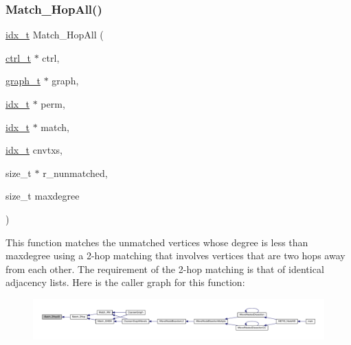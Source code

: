 \subsubsection{\texorpdfstring{Match\+\_\+Hop\+All()}{Match\_2HopAll()}}
{\footnotesize\ttfamily \hyperlink{a00876_aaa5262be3e700770163401acb0150f52}{idx\+\_\+t} Match\+\_\+Hop\+All (\begin{DoxyParamCaption}\item[{\hyperlink{a00742}{ctrl\+\_\+t} $\ast$}]{ctrl,  }\item[{\hyperlink{a00734}{graph\+\_\+t} $\ast$}]{graph,  }\item[{\hyperlink{a00876_aaa5262be3e700770163401acb0150f52}{idx\+\_\+t} $\ast$}]{perm,  }\item[{\hyperlink{a00876_aaa5262be3e700770163401acb0150f52}{idx\+\_\+t} $\ast$}]{match,  }\item[{\hyperlink{a00876_aaa5262be3e700770163401acb0150f52}{idx\+\_\+t}}]{cnvtxs,  }\item[{size\+\_\+t $\ast$}]{r\+\_\+nunmatched,  }\item[{size\+\_\+t}]{maxdegree }\end{DoxyParamCaption})}

This function matches the unmatched vertices whose degree is less than maxdegree using a 2-\/hop matching that involves vertices that are two hops away from each other. The requirement of the 2-\/hop matching is that of identical adjacency lists. Here is the caller graph for this function\+:\nopagebreak
\begin{figure}[H]
\begin{center}
\leavevmode
\includegraphics[width=350pt]{a00945_aa56d53cace160be27fb1750dcaffbc04_icgraph}
\end{center}
\end{figure}
\mbox{\label{a00945_a838a4013e3b5cc5278ecc7a8757ce0ef}} 
